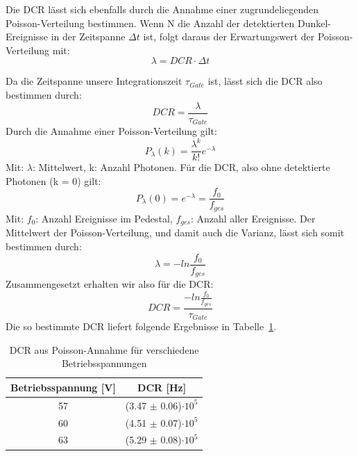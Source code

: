 \documentclass[12pt]{article}
\begin{document}
Die DCR lässt sich ebenfalls durch die Annahme einer zugrundeliegenden Poisson-Verteilung bestimmen.
Wenn N die Anzahl der detektierten Dunkel-Ereignisse in der Zeitspanne $\Delta t$ ist, folgt daraus der Erwartungswert der Poisson-Verteilung mit:
\begin{equation}
\lambda = DCR \cdot \Delta t
\end{equation}

Da die Zeitspanne unsere Integrationszeit $\tau_{Gate}$ ist, lässt sich die DCR also bestimmen durch:
\begin{equation}
DCR = \frac{\lambda}{\tau_{Gate}}
\end{equation}
Durch die Annahme einer Poisson-Verteilung gilt:
\begin{equation}
P_{\lambda}(k)=\frac{\lambda^{k}}{k!}e^{-\lambda}\label{PO}
\end{equation}
Mit: $\lambda$: Mittelwert, k: Anzahl Photonen.
Für die DCR, also ohne detektierte Photonen (k = 0) gilt:
\begin{equation}
P_{\lambda}(0)=e^{-\lambda}=\frac{f_{0}}{f_{ges}}
\end{equation}
Mit: $f_{0}$: Anzahl Ereignisse im Pedestal, $f_{ges}$: Anzahl aller Ereignisse.
Der Mittelwert der Poisson-Verteilung, und damit auch die Varianz, lässt sich somit bestimmen durch:
\begin{equation}
\lambda = -ln\frac{f_{0}}{f_{ges}}
\label{PoissonMeanEQ}
\end{equation}
Zusammengesetzt erhalten wir also für die DCR:
\begin{equation}
    DCR = \frac{-ln\frac{f_{0}}{f_{ges}}}{\tau_{Gate}}
\end{equation}
Die so bestimmte DCR liefert folgende Ergebnisse in Tabelle~\ref{DCRBestimmung2}.

\begin{table}[h]
  \begin{center}
    \begin{tabular}{|c|c|}
      \hline
      Betriebsspannung [V] & DCR [Hz] \\
      \hline
      57 & (3.47 $\pm$ 0.06)$\cdot 10^{5}$ \\
      60 & (4.51 $\pm$ 0.07)$\cdot 10^{5}$ \\
      63 & (5.29 $\pm$ 0.08)$\cdot 10^{5}$ \\
      \hline
    \end{tabular}
    \caption{DCR aus Poisson-Annahme für verschiedene Betriebsspannungen}
    \label{DCRBestimmung2}
  \end{center}
\end{table}
\end{document}
